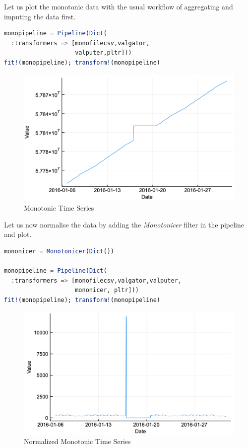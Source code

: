 \documentclass{juliacon}
\begin{document}
Let us plot the monotonic data with the usual workflow of aggregating and imputing the data first.

\begin{lstlisting}[language = Julia]
monopipeline = Pipeline(Dict(
  :transformers => [monofilecsv,valgator,
                    valputer,pltr]))
fit!(monopipeline); transform!(monopipeline)
\end{lstlisting}

\begin{figure}[htbp]
   \centering
   \includegraphics[width=0.9\columnwidth]{mono.png} %
   \caption{Monotonic Time Series}
   \label{fig:mono}
\end{figure}

Let us now normalise the data by adding the \emph{Monotonicer} filter in the pipeline and plot.

\begin{lstlisting}[language = Julia]
mononicer = Monotonicer(Dict())

monopipeline = Pipeline(Dict(
  :transformers => [monofilecsv,valgator,valputer,
                    mononicer, pltr]))
fit!(monopipeline); transform!(monopipeline)
\end{lstlisting}

\begin{figure}[htbp]
   \centering
   \includegraphics[width=\columnwidth]{mononicer.png} %
   \caption{Normalized Monotonic Time Series}
   \label{fig:nmono}
\end{figure}
\end{document}
